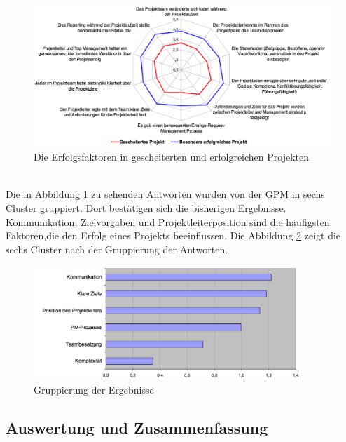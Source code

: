\documentclass[12pt]{scrartcl}
\begin{document}
\begin{figure}[H]
	\begin{center}
		\includegraphics[width=1.1\textwidth]{img/ergebnis_erfolgsfaktoren}
		\caption{Die Erfolgsfaktoren in gescheiterten und erfolgreichen Projekten}
		\label{ergebnis_gpm_erfolgsfaktoren}	
	\end{center}
\end{figure}
\ \\
Die in Abbildung \ref{ergebnis_gpm_erfolgsfaktoren} zu sehenden Antworten wurden von der GPM in sechs Cluster gruppiert. Dort bestätigen sich die bisherigen Ergebnisse. Kommunikation, Zielvorgaben und Projektleiterposition sind die häufigsten Faktoren,die  den Erfolg eines Projekts beeinflussen. Die Abbildung \ref{ergebnis_gpm_gruppiert} zeigt die sechs Cluster nach der Gruppierung der Antworten. 

\begin{figure}[H]
	\begin{center}
		\includegraphics[width=0.9\textwidth]{img/ergebnis_gpm_gruppiert}
		\caption{Gruppierung der Ergebnisse}
		\label{ergebnis_gpm_gruppiert}	
	\end{center}
\end{figure}


\subsection{Auswertung und Zusammenfassung}
\end{document}
